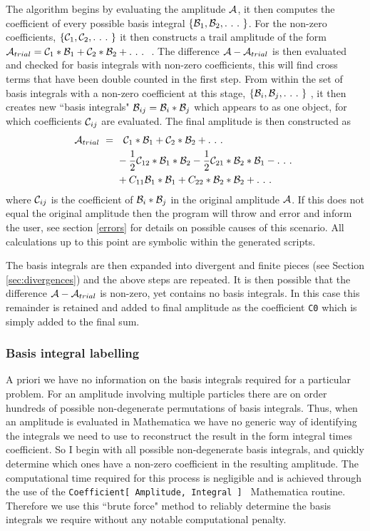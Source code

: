 The algorithm begins by evaluating the amplitude $\mathcal{A}$, it then computes the coefficient of every possible basis integral $\{\B_1,\B_2,.\ .\ .\ \}$.  For the non-zero coefficients, $\{\mathcal{C}_1,\mathcal{C}_2, .\ .\ .\  \}$ it then constructs a trail amplitude of the form $\A_{trial} = \C_1 * \B_1 + \C_2 * \B_2 + .\ .\ .\ $ . The difference $\mathcal{A} - \mathcal{A}_{trial}$ is then evaluated and checked for basis integrals with non-zero coefficients, this will find cross terms that have been double counted in the first step.  From within the set of basis integrals with a non-zero coefficient at this stage, $\{\mathcal{B}_i,\mathcal{B}_j,.\ .\ .\ \}$ , it then creates new ``basis integrals" $\mathcal{B}_{ij} =  \mathcal{B}_i*\mathcal{B}_j$ which appears to \mathematica as one object, for which coefficients $\mathcal{C}_{ij}$ are evaluated.  The final amplitude is then constructed as
\begin{align*}
 \A_{trial}\ = \ & \ \ \C_1 * \B_1 + \C_2 * \B_2 + .\ .\ .\ \\ 
  &-\frac{1}{2} \C_{12} * \B_1*\B_2  -\frac{1}{2} \C_{21} * \B_2*\B_1 - .\ .\ .\ \\
  & + C_{11} \B_1*\B_1 + C_{22}*\B_2*\B_2 + .\ .\ .\ 
\end{align*}
where $ \mathcal{C}_{ij}$ is the coefficient of  $\mathcal{B}_i*\mathcal{B}_j$ in the original amplitude $\mathcal{A}$.  If this does not equal the original amplitude then the program will throw and error and inform the user, see section \ref{errors} for details on possible causes of this scenario.  All calculations up to this point are symbolic within the generated \mathematica scripts.

The basis integrals are then expanded into divergent and finite pieces (see Section \ref{sec:divergences}) and the above steps are repeated.  It is then possible that the difference $\mathcal{A} - \mathcal{A}_{trial}$ is non-zero, yet contains no basis integrals.  In this case this remainder is retained and added to final amplitude as the coefficient \lstinline{C0} which is simply added to the final sum.

\subsubsection{Basis integral labelling}

A priori we have no information on the basis integrals required for a particular problem.  For an amplitude involving multiple particles there are on order hundreds of possible non-degenerate permutations of basis integrals.  Thus, when an amplitude is evaluated in Mathematica we have no generic way of identifying the integrals we need to use to reconstruct the result in the form integral times coefficient.  So I begin with all possible non-degenerate basis integrals, and quickly determine which ones have a non-zero coefficient in the resulting amplitude.  The computational time required for this process is negligible and is achieved through the use of the \lstinline{Coefficient[ Amplitude, Integral ] } Mathematica routine.  Therefore we use this ``brute force" method to reliably determine the basis integrals we require without any notable computational penalty.

